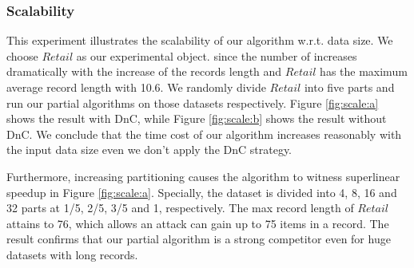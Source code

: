 

\subsubsection{Scalability}\label{sec:eval:scale}
This experiment illustrates the scalability of our algorithm
w.r.t. data size. We choose $Retail$ as our experimental object.
since the number of \qids increases dramatically with the increase of the records length
and $Retail$ has the maximum average record length with 10.6.
We randomly divide $Retail$ into five parts and
run our partial algorithms on those datasets respectively.
Figure \ref{fig:scale:a} shows the result with
DnC, while Figure \ref{fig:scale:b} shows the result
without DnC.
We conclude that the time cost of our
algorithm increases reasonably with the input data size even
we don't apply the DnC strategy.

Furthermore, increasing partitioning causes the algorithm to witness
superlinear speedup in Figure \ref{fig:scale:a}. Specially, the dataset is
divided into 4, 8, 16 and 32 parts at 1/5, 2/5, 3/5 and 1, respectively. The
max record length of $Retail$ attains to 76, which allows an attack can gain
up to 75 items in a record. The result confirms that our partial algorithm is
a strong competitor even for huge datasets with long records.


